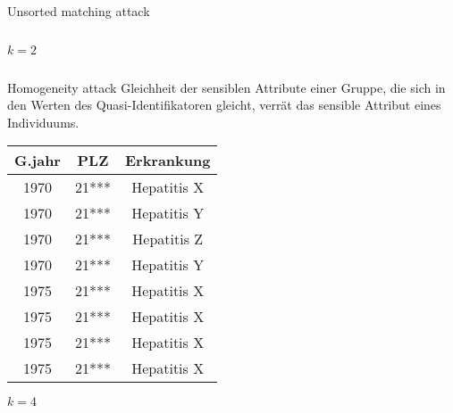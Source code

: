 \begin{frame} {Unsorted matching attack}
\begin{columns}[T]
\begin{column}[T]{0.5\textwidth}
			\(k = 2\)
	     \end{column}
     \end{columns}
	
\end{frame}


%
%


\begin{frame} {Homogeneity attack}
	Gleichheit der sensiblen Attribute einer Gruppe, die sich in den Werten des Quasi-Identifikatoren gleicht, verrät das sensible Attribut eines Individuums.
	\vspace{0.5cm}	

	\centering
	\small
	\begin{tabular}{|c|c|c|}
	\hline \textbf{G.jahr} & \textbf{PLZ} & \textbf{Erkrankung} \\
	\hline 1970 & 21*** & Hepatitis X \\ 
	 1970 & 21*** & Hepatitis Y \\ 
	 1970 & 21*** & Hepatitis Z \\ 
	 1970 & 21*** & Hepatitis Y \\ 
	\hline 1975 & 21*** & \cellcolor{svsrot}Hepatitis X \\ 
	 1975 & 21*** & \cellcolor{svsrot}Hepatitis X \\ 
	 1975 & 21*** & \cellcolor{svsrot}Hepatitis X \\ 
	 1975 & 21*** & \cellcolor{svsrot}Hepatitis X \\
	\hline 
	\end{tabular}
	\vspace{0.3cm}

	\(k = 4\)
\end{frame}


